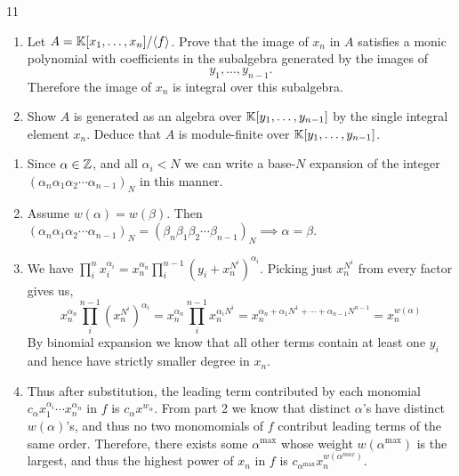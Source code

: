 \documentclass[Notebook.tex]{subfiles}
\begin{document}
\begin{problem}{11}
\begin{enumerate}
        \item Let $A=\mathbb K[x_1,\ldots,x_n]/\langle f\rangle$. Prove that the image of $x_n$ in $A$ satisfies a monic polynomial with coefficients in the subalgebra generated by the images of
        \[
        y_1,\ldots,y_{n-1}.
        \]
        Therefore the image of $x_n$ is integral over this subalgebra.

        \item Show $A$ is generated as an algebra over $\mathbb K[y_1,\ldots,y_{n-1}]$ by the single integral element $x_{n}$. Deduce that $A$ is module-finite over $\mathbb K[y_1,\ldots,y_{n-1}]$. 
    \end{enumerate}
\end{problem}

\begin{solution}
    \bbni
    \begin{enumerate}
        \item Since $\alpha \in \mathbb Z$, and all $\alpha_i < N$ we can write a base-$N$ expansion of the integer $(\alpha_n\alpha_1\alpha_2\cdots\alpha_{n-1})_N$ in this manner. 
        
        \item Assume $w(\alpha) = w(\beta)$. Then $(\alpha_n\alpha_1\alpha_2\cdots\alpha_{n-1})_N = (\beta_n\beta_1\beta_2\cdots\beta_{n-1})_N \implies \alpha = \beta$. 
        
        \item We have $\prod_i^n x_i^{\alpha_i} = x_n^{\alpha_n} \prod_i^{n-1} \left (y_i + x_n^{N^i} \right )^{\alpha_i}$. Picking just $x_n^{N^i}$ from every factor gives us, 
        \[ x_n^{\alpha_n} \prod_i^{n-1} \left (x_n^{N^i} \right )^{\alpha_i} = x_n^{\alpha_n} \prod_i^{n-1} x_n^{\alpha_i N^i} = x_n^{\alpha_n + \alpha_1 N^1 + \cdots + \alpha_{n-1}N^{n-1}} = x_n^{w(\alpha)} \]
        By binomial expansion we know that all other terms contain at least one $y_i$ and hence have strictly smaller degree in $x_n$. 

        \item Thus after substitution, the leading term contributed by each monomial $c_\alpha x_1^{\alpha_i} \cdots x_n^{\alpha_n}$ in $f$ is $c_\alpha x^{w_\alpha}$. From part 2 we know that distinct $\alpha$'s have distinct $w(\alpha)$'s, and thus no two monomomials of $f$ contribut leading terms of the same order. Therefore, there exists some $\alpha^{\max}$ whose weight $w(\alpha^{\max})$ is the largest, and thus the highest power of $x_n$ in $f$ is $c_{\alpha^{\max}} x_n^{w(\alpha^{max})}$. 
        

\end{enumerate}
\end{solution}
\end{document}
